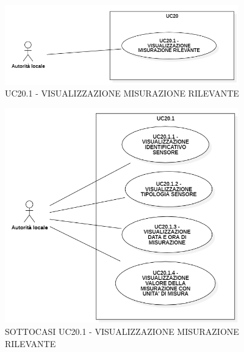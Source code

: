 \newpage

\begin{figure}[H]
    \centering
    \includegraphics[width=0.9\textwidth]{../Images/subUC20.png}
    \caption{UC20.1 - VISUALIZZAZIONE MISURAZIONE RILEVANTE }
\end{figure}





\begin{figure}[H]
    \centering
    \includegraphics[width=0.9\textwidth]{../Images/subUC20.1.png}
    \caption{SOTTOCASI UC20.1 - VISUALIZZAZIONE MISURAZIONE RILEVANTE }
\end{figure}


